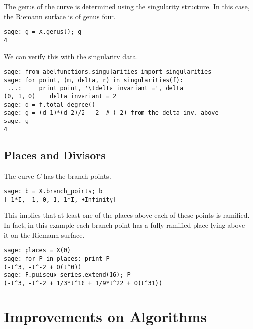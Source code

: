 \noindent The genus of the curve is determined using the singularity structure.
In this case, the Riemann surface is of genus four.

\begin{lstlisting}[language=Sage]
sage: g = X.genus(); g
4
\end{lstlisting}

\noindent We can verify this with the singularity data.

\begin{lstlisting}[language=Sage]
sage: from abelfunctions.singularities import singularities
sage: for point, (m, delta, r) in singularities(f):
 ...:     print point, '\tdelta invariant =', delta
(0, 1, 0)    delta invariant = 2
sage: d = f.total_degree()
sage: g = (d-1)*(d-2)/2 - 2  # (-2) from the delta inv. above
sage: g
4
\end{lstlisting}

\subsection{Places and Divisors}

The curve $C$ has the branch points,

\begin{lstlisting}[language=Sage]
sage: b = X.branch_points; b
[-1*I, -1, 0, 1, 1*I, +Infinity]
\end{lstlisting}

\noindent This implies that at least one of the places above each of these
points is ramified. In fact, in this example each branch point has a
fully-ramified place lying above it on the Riemann surface.

\begin{lstlisting}[language=Sage]
sage: places = X(0)
sage: for P in places: print P
(-t^3, -t^-2 + O(t^0))
sage: P.puiseux_series.extend(16); P
(-t^3, -t^-2 + 1/3*t^10 + 1/9*t^22 + O(t^31))
\end{lstlisting}


\section{Improvements on
  Algorithms}\label{sec:abelfunctions-improvements-on-algorithms}


